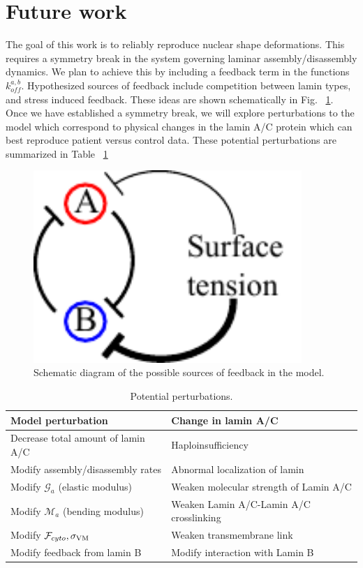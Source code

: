 \section{Future work} \label{sec:futurework}

The goal of this work is to reliably reproduce nuclear shape deformations. This requires a symmetry break in the system governing laminar assembly/disassembly dynamics. We plan to achieve this by including a feedback term in the functions $k_{off}^{a,b}$. Hypothesized sources of feedback include competition between lamin types, and stress induced feedback. These ideas are shown schematically in Fig. ~\ref{fig::feedback}. Once we have established a symmetry break, we will explore perturbations to the model which correspond to physical changes  in the lamin A/C protein which can best reproduce patient versus control data. These potential perturbations are summarized in Table ~\ref{tab:perturbations}


\begin{figure}[h]
\centering
\captionsetup{width=.9\linewidth}
\includegraphics[width=4in]{Project3/figs/feedback_stretch.pdf}
\caption{Schematic diagram of the possible sources of feedback in the model.}
\label{fig::feedback}
\end{figure}


\begin{table}[t!]
\caption{Potential perturbations.}\centering \label{tab:perturbations} 
\begin{tabular}{ l  l}
\hline
Model perturbation & Change in lamin A/C \\
\hline
Decrease total amount of lamin A/C  & Haploinsufficiency  \\
Modify assembly/disassembly rates & Abnormal localization of lamin\\
Modify $\mathcal{G}_a$ (elastic modulus) & Weaken molecular strength of Lamin A/C  \\
Modify $\mathcal{M}_a$ (bending modulus)& Weaken Lamin A/C-Lamin A/C crosslinking  \\
Modify $\mathcal{F}_{cyto}, \sigma_{\rm VM}$ & Weaken transmembrane link  \\
Modify feedback from lamin B &Modify interaction with Lamin B \\
\hline
\end{tabular}
\end{table}